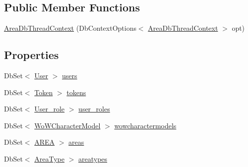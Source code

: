 \subsection*{Public Member Functions}
\begin{DoxyCompactItemize}
\item 
\mbox{\hyperlink{classArea_1_1DAT_1_1AreaDbThreadContext_ab5339ffc8ee9669ac3a13b62a622e746}{Area\+Db\+Thread\+Context}} (Db\+Context\+Options$<$ \mbox{\hyperlink{classArea_1_1DAT_1_1AreaDbThreadContext}{Area\+Db\+Thread\+Context}} $>$ opt)
\end{DoxyCompactItemize}
\subsection*{Properties}
\begin{DoxyCompactItemize}
\item 
Db\+Set$<$ \mbox{\hyperlink{classArea_1_1Models_1_1User}{User}} $>$ \mbox{\hyperlink{classArea_1_1DAT_1_1AreaDbThreadContext_a58df7d30567900ef42b1e26bfc2bbba0}{users}}
\item 
Db\+Set$<$ \mbox{\hyperlink{classArea_1_1Models_1_1Token}{Token}} $>$ \mbox{\hyperlink{classArea_1_1DAT_1_1AreaDbThreadContext_a42fe53b25ddbc24b01c9fd2b7e81de40}{tokens}}
\item 
Db\+Set$<$ \mbox{\hyperlink{classArea_1_1Models_1_1User__role}{User\+\_\+role}} $>$ \mbox{\hyperlink{classArea_1_1DAT_1_1AreaDbThreadContext_a371fd9e63da8effa604887e7ef010151}{user\+\_\+roles}}
\item 
Db\+Set$<$ \mbox{\hyperlink{classArea_1_1Models_1_1WoWCharacterModel}{Wo\+W\+Character\+Model}} $>$ \mbox{\hyperlink{classArea_1_1DAT_1_1AreaDbThreadContext_ab322f4c561f0c411dd4f1b4d151e6d26}{wowcharactermodels}}
\item 
Db\+Set$<$ \mbox{\hyperlink{classArea_1_1Models_1_1AREA}{A\+R\+EA}} $>$ \mbox{\hyperlink{classArea_1_1DAT_1_1AreaDbThreadContext_a025ba5d7d31252cdb83d49d3dcd4122f}{areas}}
\item 
Db\+Set$<$ \mbox{\hyperlink{classArea_1_1Models_1_1AreaType}{Area\+Type}} $>$ \mbox{\hyperlink{classArea_1_1DAT_1_1AreaDbThreadContext_a30ac7d33b5e632232ae46fdc842ec349}{areatypes}}
\end{DoxyCompactItemize}


